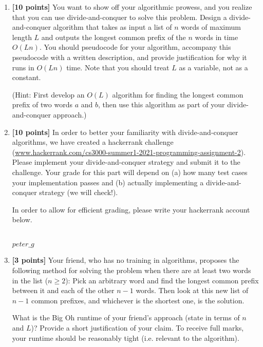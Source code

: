 \documentclass[11pt]{article}
\theoremstyle{definition}
\theoremstyle{theorem}
\newcommand{\solution}{\medskip\noindent{\color{DarkBlue}\textbf{Solution:}}}
\begin{document}
\begin{enumerate}[label=(\alph*)]



\item \textbf{[10 points]} You want to show off your algorithmic prowess, and you realize that you can use divide-and-conquer to solve this problem.
 Design a divide-and-conquer algorithm that takes as input a list of $n$ words of maximum length $L$ and outputs the longest common prefix of the $n$ words in time $O(Ln)$. You should pseudocode for your algorithm, accompany this pseudocode with a written description, and provide justification for why it runs in $O(Ln)$ time. Note that you should treat $L$ as a variable, not as a constant.

(Hint: First develop an $O(L)$ algorithm for finding the longest common prefix of two words $a$ and $b$, then use this algorithm as part of your divide-and-conquer approach.)

\solution




\item \textbf{[10 points]} In order to better your familiarity with divide-and-conquer algorithms, we have created a hackerrank challenge (\href{www.hackerrank.com/cs3000-summer1-2021-programming-assignment-2}{www.hackerrank.com/cs3000-summer1-2021-programming-assignment-2}). Please implement your divide-and-conquer strategy and submit it to the challenge. Your grade for this part will depend on (a) how many test cases your implementation passes and (b) actually implementing a divide-and-conquer strategy (we will check!).

In order to allow for efficient grading, please write your hackerrank account below.

\solution \\
$peter\_g$

\item \textbf{[3 points]} Your friend, who has no training in algorithms, proposes the following method for solving the problem when there are at least two words in the list ($n \geq 2$): Pick an arbitrary word and find the longest common prefix between it and each of the other $n-1$ words. Then look at this new list of $n-1$ common prefixes, and whichever is the shortest one, is the solution.  

What is the Big Oh runtime of your friend's approach (state in terms of $n$ and $L$)? Provide a short justification of your claim. To receive full marks, your runtime should be reasonably tight (i.e. relevant to the algorithm).


\end{enumerate}
\end{document}
